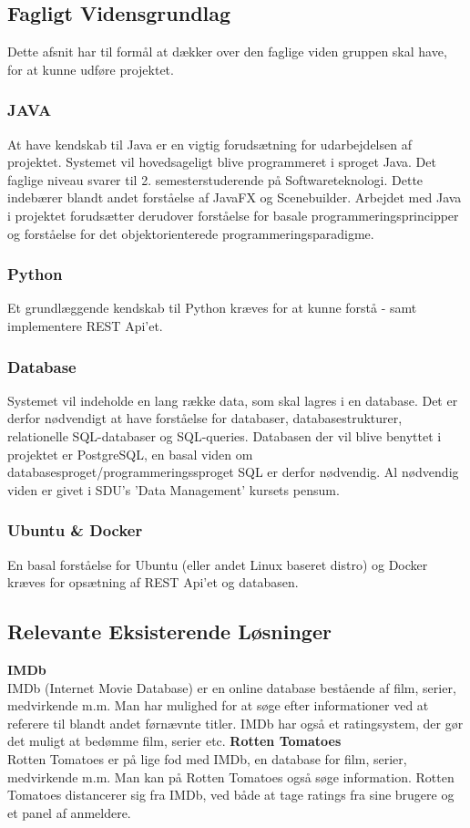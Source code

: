 \subsection{Fagligt Vidensgrundlag}
Dette afsnit har til formål at dækker over den faglige viden gruppen skal have, for at kunne udføre projektet.

\subsubsection{JAVA}
At have kendskab til Java er en vigtig forudsætning for udarbejdelsen af projektet. Systemet vil hovedsageligt blive programmeret i sproget Java. Det faglige niveau svarer til 2. semesterstuderende på Softwareteknologi. Dette indebærer blandt andet forståelse af JavaFX og Scenebuilder.
Arbejdet med Java i projektet forudsætter derudover forståelse for basale programmeringsprincipper og forståelse for det objektorienterede programmeringsparadigme. 

\subsubsection{Python}
Et grundlæggende kendskab til Python kræves for at kunne forstå - samt implementere REST Api'et.

\subsubsection{Database}
Systemet vil indeholde en lang række data, som skal lagres i en database. Det er derfor nødvendigt at have forståelse for databaser, databasestrukturer, relationelle SQL-databaser og SQL-queries. Databasen der vil blive benyttet i projektet er PostgreSQL, en basal viden om databasesproget/programmeringssproget SQL er derfor nødvendig. 
Al nødvendig viden er givet i SDU's 'Data Management' kursets pensum.

\subsubsection{Ubuntu \& Docker}
En basal forståelse for Ubuntu (eller andet Linux baseret distro) og Docker kræves for opsætning af REST Api'et og databasen.

\subsection{Relevante Eksisterende Løsninger}
\textbf{IMDb} \\
IMDb (Internet Movie Database) er en online database bestående af film, serier, medvirkende m.m. Man har mulighed for at søge efter informationer ved at referere til blandt andet førnævnte titler. IMDb har også et ratingsystem, der gør det muligt at bedømme film, serier etc.
\textbf{Rotten Tomatoes} \\
Rotten Tomatoes er på lige fod med IMDb, en database for film, serier, medvirkende m.m. Man kan på Rotten Tomatoes også søge information. Rotten Tomatoes distancerer sig fra IMDb, ved både at tage ratings fra sine brugere og et panel af anmeldere. 

